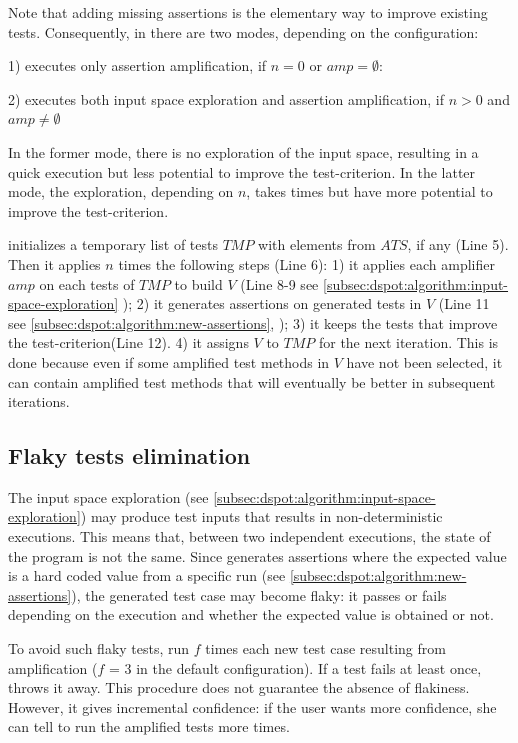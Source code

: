 Note that adding missing assertions is the elementary way to improve existing tests.
Consequently, in \dspot there are two modes, depending on the configuration:

1) \dspot executes only assertion amplification, if $n = 0$ or $amp = \emptyset $:

2) \dspot executes both input space exploration and assertion amplification, if $n > 0$ and $amp \ne \emptyset$

In the former mode, there is no exploration of the input space, resulting in a quick execution but less potential to improve the test-criterion.
In the latter mode, the exploration, depending on $n$, takes times but have more potential to improve the test-criterion.

\dspot initializes a temporary list of tests $TMP$ with elements from $ATS$, if any (Line 5).
Then it applies $n$ times the following steps (Line 6):
1) it applies each amplifier $amp$ on each tests of $TMP$ to build $V$ (Line 8-9 see \autoref{subsec:dspot:algorithm:input-space-exploration} \ie \Iampl);
2) it generates assertions on generated tests in $V$ (Line 11 see \autoref{subsec:dspot:algorithm:new-assertions}, \ie \Aampl);
3) it keeps the tests that improve the test-criterion(Line 12).
4) it assigns $V$ to $TMP$ for the next iteration. This is done because even if some amplified test methods in $V$ have not been selected, it can contain amplified test methods that will eventually be better in subsequent iterations.

\subsection{Flaky tests elimination}
\label{subsec:dspot:algorithm:flaky-test-elimination}
The input space exploration (see \autoref{subsec:dspot:algorithm:input-space-exploration}) may produce test inputs that results in non-deterministic executions.
This means that, between two independent executions, the state of the program is not the same.
Since \dspot generates assertions where the expected value is a hard coded value from a specific run (see \autoref{subsec:dspot:algorithm:new-assertions}), the generated test case may become flaky: it passes or fails depending on the execution and whether the expected value is obtained or not.

To avoid such flaky tests, \dspot run $f$ times each new test case resulting from amplification ($f$ = 3 in the default configuration). 
If a test fails at least once, \dspot throws it away. 
This procedure does not guarantee the absence of flakiness.
However, it gives incremental confidence: if the user wants more confidence, she can tell \dspot to run the amplified tests more times.

